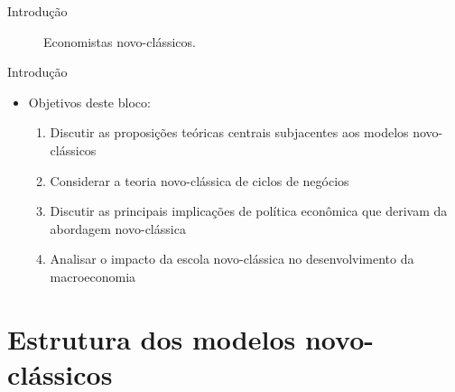 \documentclass[10pt]{beamer}
\begin{document}
\begin{frame}{Introdução}
    \begin{figure}
        \centering
         \quad
        \caption{Economistas novo-clássicos.}
        \label{fig1p2}
    \end{figure}
\end{frame}

\begin{frame}{Introdução}
    \begin{itemize}
        \item Objetivos deste bloco:
        \bigskip
        \begin{enumerate}
            \item Discutir as proposições teóricas centrais subjacentes aos modelos novo-clássicos
            \bigskip
            \item Considerar a teoria novo-clássica de ciclos de negócios
            \bigskip
            \item Discutir as principais implicações de política econômica que derivam da abordagem novo-clássica
            \bigskip
            \item Analisar o impacto da escola novo-clássica no desenvolvimento da macroeconomia
        \end{enumerate}
    \end{itemize}
\end{frame}

\section{Estrutura dos modelos novo-clássicos}
\end{document}
